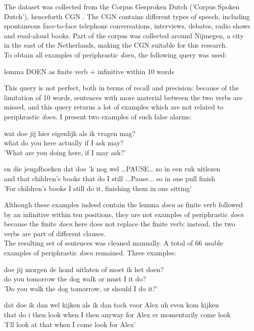 \documentclass[12pt]{article}
\begin{document}
The dataset was collected from the Corpus Gesproken Dutch ('Corpus Spoken Dutch'), henceforth CGN \citep{cgn}. The CGN contains different types of speech, including spontaneous face-to-face telephone conversations, interviews, debates, radio shows and read-aloud books. Part of the corpus was collected around Nijmegen, a city in the east of the Netherlands, making the CGN suitable for this research.\\\indent
To obtain all examples of periphrastic \emph{doen}, the following query was used:

\begin{exe}
\ex lemma DOEN as finite verb + infinitive within 10 words
\end{exe}

This query is not perfect, both in terms of recall and precision: because of the limitation of 10 words, sentences with more material between the two verbs are missed, and this query returns a lot of examples which are not related to periphrastic \emph{doen}. I present two examples of such false alarms:

\begin{exe}
\ex \gll wat doe jij hier eigenlijk als ik vragen mag? \\
what do you here actually if I ask may?\\
\trans 'What are you doing here, if I may ask?'

\ex \gll en die jeugdboeken dat doe 'k {nog wel} …PAUSE… zo in een ruk uitlezen \\
and that {children's books} that do I still ...Pause... so in one pull finish\\
\trans 'For children's books I still do it, finishing them in one sitting'
\end{exe}

Although these examples indeed contain the lemma \emph{doen} as finite verb followed by an infinitive within ten positions, they are not examples of periphrastic \emph{doen} because the finite \emph{doen} here does not replace the finite verb; instead, the two verbs are part of different clauses.\\\indent
The resulting set of sentences was cleaned manually. A total of 66 usable examples of periphrastic \emph{doen} remained. Three examples:

\begin{exe} 
\ex \gll doe jij morgen de hond uitlaten of moet ik het doen? \\ 
do you tomorrow the dog walk or must I it do?\\ \label{hond}
\trans 'Do you walk the dog tomorrow, or should I do it?'

\ex \gll dat doe ik {dan wel} kijken als ik dan toch voor Alex uh even kom kijken \\
that do i then look when I then anyway for Alex er momentarily come look\\ \label{Alex}
\trans 'I'll look at that when I come look for Alex'
\end{exe}
\end{document}
